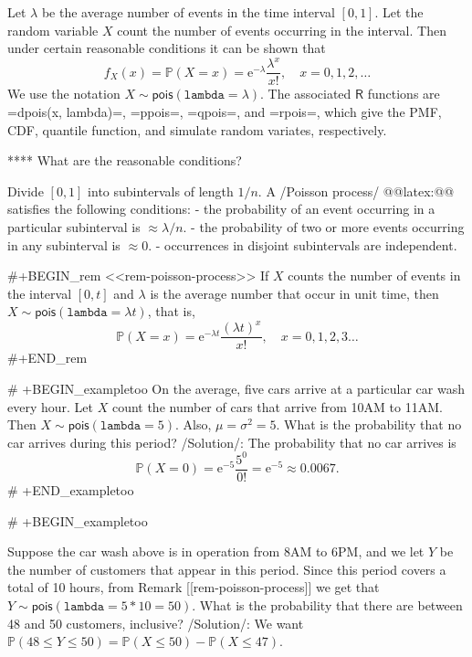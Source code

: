 {Let \(\lambda\) be the average number of events in the time interval
\([0,1]\). Let the random variable \(X\) count the number of events
occurring in the interval. Then under certain reasonable conditions it
can be shown that
\begin{equation}
f_{X}(x)=\mathbb{P}(X=x)=\mathrm{e}^{-\lambda}\frac{\lambda^{x}}{x!},\quad x=0,1,2,\ldots
\end{equation}
We use the notation
\(X\sim\mathsf{pois}(\mathtt{lambda}=\lambda)\). The associated
\(\mathsf{R}\) functions are =dpois(x, lambda)=, =ppois=, =qpois=, and
=rpois=, which give the PMF, CDF, quantile function, and simulate
random variates, respectively.

**** What are the reasonable conditions?

Divide \([0,1]\) into subintervals of length \(1/n\). A /Poisson
process/ @@latex:@@ satisfies the following conditions:
- the probability of an event occurring in a particular subinterval is
  \(\approx\lambda/n\).
- the probability of two or more events occurring in any subinterval
  is \(\approx 0\).
- occurrences in disjoint subintervals are independent.

#+BEGIN_rem
<<rem-poisson-process>> If \(X\) counts the number of events in the
interval \([0,t]\) and \(\lambda\) is the average number that occur in
unit time, then \(X\sim\mathsf{pois}(\mathtt{lambda}=\lambda t)\),
that is,
\begin{equation}
\mathbb{P}(X=x)=\mathrm{e}^{-\lambda t}\frac{(\lambda t)^{x}}{x!},\quad x=0,1,2,3\ldots
\end{equation}
#+END_rem

# +BEGIN_exampletoo
On the average, five cars arrive at a particular car wash every
hour. Let \(X\) count the number of cars that arrive from 10AM to
11AM. Then \(X\sim\mathsf{pois}(\mathtt{lambda}=5)\). Also,
\(\mu=\sigma^{2}=5\). What is the probability that no car arrives
during this period?  /Solution/: The probability that no car arrives
is \[
\mathbb{P}(X=0)=\mathrm{e}^{-5}\frac{5^{0}}{0!}=\mathrm{e}^{-5}\approx0.0067.
\]
# +END_exampletoo


# +BEGIN_exampletoo

Suppose the car wash above is in operation from 8AM to 6PM, and we let
\(Y\) be the number of customers that appear in this period. Since
this period covers a total of 10 hours, from Remark [[rem-poisson-process]] we
get that \(Y\sim\mathsf{pois}(\mathtt{lambda}=5\ast10=50)\). What is
the probability that there are between 48 and 50 customers, inclusive?
/Solution/: We want \(\mathbb{P}(48\leq
Y\leq50)=\mathbb{P}(X\leq50)-\mathbb{P}(X\leq47)\).

}
